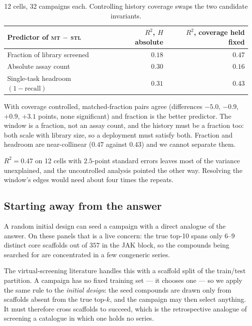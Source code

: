 \documentclass[11pt]{article}
\newcommand{\stl}{\textsc{stl}}
\newcommand{\mt}{\textsc{mt}}
\begin{document}
\begin{table}[ht]
\centering\small
\begin{tabular}{lrr}
\toprule
Predictor of \mt{} $-$ \stl{} & $R^2$, $H$ absolute & $R^2$, coverage held fixed \\
\midrule
Fraction of library screened & $0.18$ & $\mathbf{0.47}$ \\
Absolute assay count         & $0.30$ & $0.16$ \\
Single-task headroom $(1 - \text{recall})$ & $0.31$ & $0.43$ \\
\bottomrule
\end{tabular}
\caption{12 cells, 32 campaigns each. Controlling history coverage swaps the
two candidate invariants.}
\label{tab:scaling}
\end{table}

With coverage controlled, matched-fraction pairs agree (differences $-5.0$,
$-0.9$, $+0.9$, $+3.1$ points, none significant) and fraction is the better
predictor. The window is a fraction, not an assay count, and the history must be
a fraction too: both scale with library size, so a deployment must satisfy both.
Fraction and headroom are near-collinear ($0.47$ against $0.43$) and we cannot
separate them.

$R^2 = 0.47$ on 12 cells with $2.5$-point standard errors leaves most of the
variance unexplained, and the uncontrolled analysis pointed the other way.
Resolving the window's edges would need about four times the repeats.

\subsection{Starting away from the answer}
\label{sec:scaffold}

A random initial design can seed a campaign with a direct analogue of the
answer. On these panels that is a live concern: the true top-10 spans only
$6$--$9$ distinct core scaffolds out of $357$ in the JAK block, so the
compounds being searched for are concentrated in a few congeneric series.

The virtual-screening literature handles this with a scaffold split of the
train/test partition. A campaign has no fixed training set --- it chooses one
--- so we apply the same rule to the \emph{initial design}: the seed compounds
are drawn only from scaffolds absent from the true top-$k$, and the campaign may
then select anything. It must therefore cross scaffolds to succeed, which is the
retrospective analogue of screening a catalogue in which one holds no series.
\end{document}
